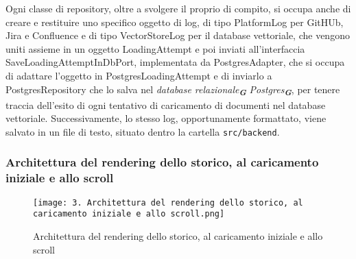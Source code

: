 Ogni classe di repository, oltre a svolgere il proprio di compito, si occupa anche di creare e restituire uno specifico oggetto di log, di tipo PlatformLog per GitHUb, Jira e Confluence e di tipo VectorStoreLog per il database vettoriale, che vengono uniti assieme in un oggetto LoadingAttempt e poi inviati all'interfaccia SaveLoadingAttemptInDbPort, implementata da PostgresAdapter, che si occupa di adattare l'oggetto in PostgresLoadingAttempt e di inviarlo a PostgresRepository che lo salva nel \emph{database relazionale}\textsubscript{\textbf{\textit{G}}} \emph{Postgres}\textsubscript{\textbf{\textit{G}}}, per tenere traccia dell'esito di ogni tentativo di caricamento di documenti nel database vettoriale. Successivamente, lo stesso log, opportunamente formattato, viene salvato in un file di testo, situato dentro la cartella \texttt{src/backend}.

\newpage


\subsubsection{Architettura del rendering dello storico, al caricamento iniziale e allo scroll}
\label{sec:architettura_rendering_storico}

\begin{figure}[h]
    \centering
    \texttt{[image: 3. Architettura del rendering dello storico, al caricamento iniziale e allo scroll.png]}
    \caption{Architettura del rendering dello storico, al caricamento iniziale e allo scroll}
\end{figure}

